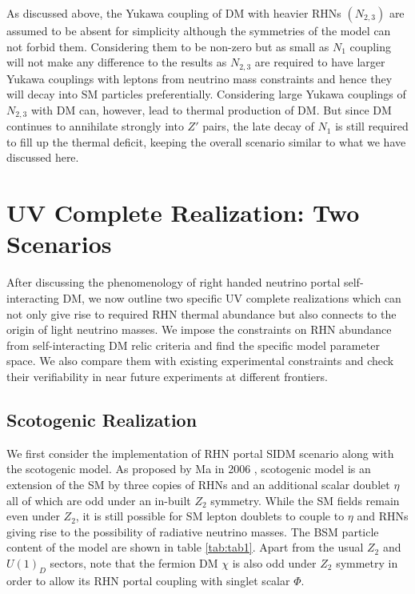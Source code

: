 \documentclass[prd,nofootinbib,preprint,superscriptaddress]{revtex4}
\begin{document}
As discussed above, the Yukawa coupling of DM with heavier RHNs $(N_{2,3})$ are assumed to be absent for simplicity although the symmetries of the model can not forbid them. Considering them to be non-zero but as small as $N_{1}$ coupling will not make any difference to the results as $N_{2, 3}$ are required to have larger Yukawa couplings with leptons from neutrino mass constraints and hence they will decay into SM particles preferentially. Considering large Yukawa couplings of $N_{2,3}$ with DM can, however, lead to thermal production of DM. But since DM continues to annihilate strongly into $Z'$ pairs, the late decay of $N_1$ is still required to fill up the thermal deficit, keeping the overall scenario similar to what we have discussed here.


\section{UV Complete Realization: Two Scenarios}
\label{examples}
After discussing the phenomenology of right handed neutrino portal self-interacting DM, we now outline two specific UV complete realizations which can not only give rise to required RHN thermal abundance but also connects to the origin of light neutrino masses. We impose the constraints on RHN abundance from self-interacting DM relic criteria and find the specific model parameter space. We also compare them with existing experimental constraints and check their verifiability in near future experiments at different frontiers.
\subsection{Scotogenic Realization} 
We first consider the implementation of RHN portal SIDM scenario along with the scotogenic model. As proposed by Ma in 2006 \cite{Ma:2006km}, scotogenic model is an extension of the SM by three copies of RHNs and an additional scalar doublet $\eta$ all of which are odd under an in-built $Z_2$ symmetry. While the SM fields remain even under $Z_2$, it is still possible for SM lepton doublets to couple to $\eta$ and RHNs giving rise to the possibility of radiative neutrino masses. The BSM particle content of the model are shown in table \ref{tab:tab1}. Apart from the usual $Z_2$ and $U(1)_D$ sectors, note that the fermion DM $\chi$ is also odd under $Z_2$ symmetry in order to allow its RHN portal coupling with singlet scalar $\Phi$.
\end{document}
